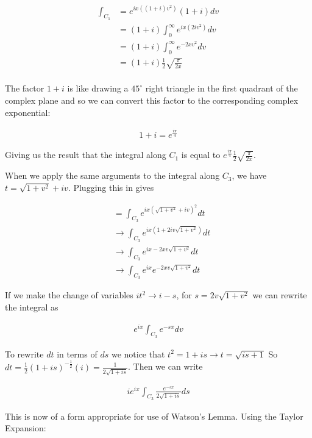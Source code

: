 \documentclass[paper=a4, fontsize=11pt]{scrartcl} %
\numberwithin{equation}{section} %
\numberwithin{figure}{section} %
\numberwithin{table}{section} %
\begin{document}
\begin{align}
\int_{C_1} &= e^{i x ((1 + i)v^2)}(1 + i) dv \\
&= (1 + i) \int_{0}^{\infty} e^{i x (2 i v^2)} dv \\
&= (1 + i) \int_{0}^{\infty} e^{- 2 x v^2} dv \\
&= (1 + i) \frac{1}{2}\sqrt{\frac{\pi}{2x}} \\
\end{align}

The factor $1 + i$ is like drawing a $45^\circ$ right triangle in the first quadrant of the complex plane and so we can convert this factor to the corresponding complex exponential:

\begin{align}
1 + i = e^{\frac{i \pi}{4}}
\end{align}

Giving us the result that the integral along $C_1$ is equal to $e^{\frac{i \pi}{4}} \frac{1}{2} \sqrt{\frac{\pi}{2x}}$.

\hspace{2mm}

When we apply the same arguments to the integral along $C_3$, we have $t = \sqrt{1 + v^2} + iv$. Plugging this in gives

\begin{align}
&=\int_{C_3}e^{ix (\sqrt{1 + v^2} + iv)^2} dt \\
&\rightarrow \int_{C_3}e^{ix (1 + 2 i v \sqrt{1 + v^2})}dt \\
&\rightarrow \int_{C_3}e^{ix - 2xv \sqrt{1 + v^2}} dt \\
&\rightarrow \int_{C_3}e^{ix}e^{-2xv \sqrt{1 + v^2}} dt
\end{align}


If we make the change of variables $it^2 \rightarrow  i - s$, for $s = 2v \sqrt{1 + v^2}$ we can rewrite the integral as 

\begin{align}
e^{ix} \int_{C_3} e^{-sx} dv
\end{align}

To rewrite $dt$ in terms of $ds$ we notice that $t^2 = 1 + is \rightarrow t = \sqrt{is + 1}$ So $dt = \frac{1}{2} (1 + is)^{- \frac{1}{2}}(i) = \frac{1}{2\sqrt{1 + is}}$. Then we can write

\begin{align}
ie^{ix} \int_{C_3} \frac{e^{-sx}}{2 \sqrt{1 + is}} ds
\end{align} 

This is now of a form appropriate for use of Watson's Lemma. Using the Taylor Expansion:
\end{document}
